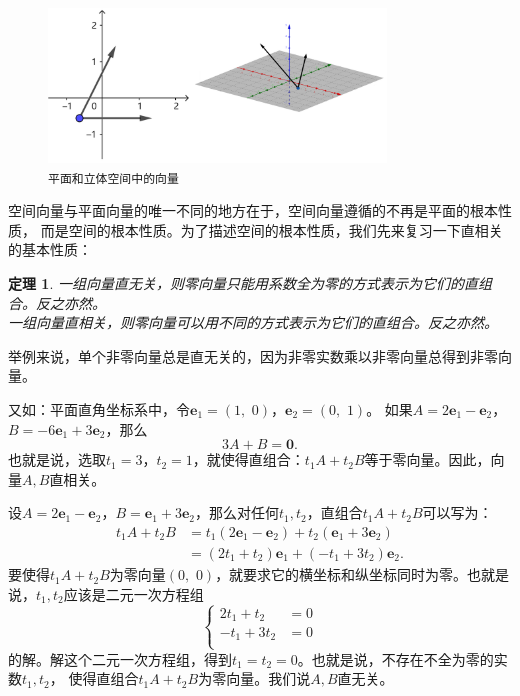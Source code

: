 \documentclass[12pt,UTF8]{ctexbook}
\newtheorem{tm}{定理}[section]
\begin{document}
\begin{figure}[h] 
    \centering
    \includegraphics[width=0.8\textwidth]{tu/平面和空间向量1.png}
    \caption*{\texttt{平面和立体空间中的向量}}
\end{figure}

空间向量与平面向量的唯一不同的地方在于，空间向量遵循的不再是平面的根本性质，
而是空间的根本性质。为了描述空间的根本性质，我们先来复习一下直相关的基本性质：
\begin{tm}
    一组向量直无关，则零向量只能用系数全为零的方式表示为它们的直组合。反之亦然。\\
    一组向量直相关，则零向量可以用不同的方式表示为它们的直组合。反之亦然。
\end{tm}

举例来说，单个非零向量总是直无关的，因为非零实数乘以非零向量总得到非零向量。

又如：平面直角坐标系中，令$\mathbf{e}_1=(1,\,\,0)$，$\mathbf{e}_2=(0,\,\,1)$。
如果$A = 2\mathbf{e}_1 - \mathbf{e}_2$，$B = -6\mathbf{e}_1 + 3 \mathbf{e}_2$，那么
$$3A + B = \mathbf{0}.$$
也就是说，选取$t_1 = 3$，$t_2 = 1$，就使得直组合：$t_1A + t_2B$等于零向量。因此，向量$A, B$直相关。

设$A = 2\mathbf{e}_1 - \mathbf{e}_2$，$B = \mathbf{e}_1 + 3 \mathbf{e}_2$，那么对任何$t_1,t_2$，直组合$t_1A + t_2B$可以写为：
\begin{align*}
t_1A + t_2B &= t_1 \left( 2\mathbf{e}_1 - \mathbf{e}_2 \right) + t_2 \left( \mathbf{e}_1 + 3 \mathbf{e}_2 \right)  \\
&= (2t_1 + t_2) \mathbf{e}_1 + (-t_1 + 3t_2)\mathbf{e}_2.
\end{align*}
要使得$t_1A + t_2B$为零向量$(0,\,\,0)$，就要求它的横坐标和纵坐标同时为零。也就是说，$t_1,t_2$应该是二元一次方程组
$$
\left\{
\begin{array}{cl}
  2t_1 + t_2 &= 0 \\
  -t_1 +3t_2 &= 0 \\
\end{array}
\right.
$$
的解。解这个二元一次方程组，得到$t_1=t_2=0$。也就是说，不存在不全为零的实数$t_1, t_2$，
使得直组合$t_1A + t_2B$为零向量。我们说$A, B$直无关。
\end{document}
